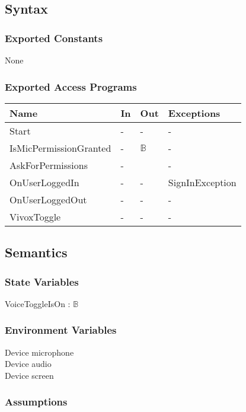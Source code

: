 \documentclass[12pt, titlepage]{article}
\begin{document}
\subsection{Syntax}

\subsubsection{Exported Constants}
None

\subsubsection{Exported Access Programs}

\begin{center}
\begin{tabular}{p{5cm} p{4cm} p{4cm} p{2cm}}
\hline
\textbf{Name} & \textbf{In} & \textbf{Out} & \textbf{Exceptions} \\
\hline
Start & - & - & - \\
IsMicPermissionGranted  & - & $\mathds{B}$ & - \\
AskForPermissions  & - &  & - \\
OnUserLoggedIn  & - & - & SignInException \\
OnUserLoggedOut  & - & - & - \\
VivoxToggle  & - & - & - \\
\hline
\end{tabular}
\end{center}

\subsection{Semantics}

\subsubsection{State Variables}

VoiceToggleIsOn : $\mathds{B}$

\subsubsection{Environment Variables}

Device microphone\\
Device audio\\
Device screen

\subsubsection{Assumptions}
\end{document}
